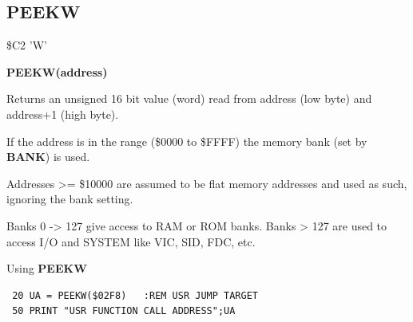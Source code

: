 \subsection{PEEKW}
\begin{description}[leftmargin=2cm,style=nextline]
\item [Token:] \$C2 'W'
\item [Format:] {\bf PEEKW(address)}
\item [Usage:]  Returns an unsigned 16 bit value (word)
                read from address (low byte) and address+1 (high byte).

                If the address is in the range (\$0000 to \$FFFF) the
                memory bank (set by {\bf BANK}) is used.

                Addresses >= \$10000 are assumed to be flat memory
                addresses and used as such, ignoring the bank setting.


\item [Remarks:] Banks 0 -> 127 give access to RAM or ROM banks.
                 Banks > 127 are used to access I/O and SYSTEM
                 like VIC, SID, FDC, etc.
\item [Example:] Using {\bf PEEKW}

\begin{tcolorbox}[colback=black,coltext=white]
\verbatimfont{\codefont}
\begin{verbatim}
 20 UA = PEEKW($02F8)   :REM USR JUMP TARGET
 50 PRINT "USR FUNCTION CALL ADDRESS";UA
\end{verbatim}
\end{tcolorbox}
\end{description}


\newpage
